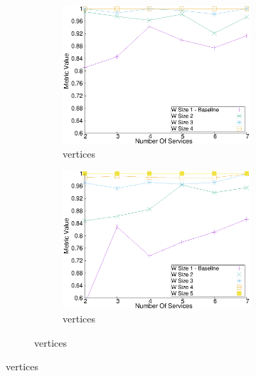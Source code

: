 \begin{figure}[H]
\begin{adjustbox}{minipage=\linewidth,scale=0.75}
\begin{subfigure}{0.45\textwidth}
\begin{subfigure}{\textwidth}
            \includegraphics[width=\textwidth]{Images/graphs/window_quality_performance_diff_perce_n7_s7_20_100_n4}
            \caption{ vertices}
            \label{fig:quality_window_wide_perce_n4}
          \end{subfigure}
          \begin{subfigure}{\textwidth}
            \includegraphics[width=\textwidth]{Images/graphs/window_quality_performance_diff_perce_n7_s7_20_100_n5}
            \caption{ vertices}

            \label{fig:quality_window_wide_perce_n5}
          \end{subfigure}


\end{subfigure}
\end{adjustbox}
\end{figure}
